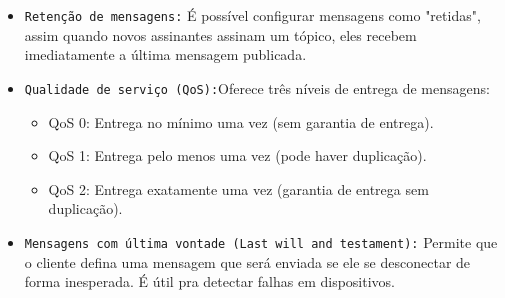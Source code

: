 \documentclass[a4paper]{article}
\begin{document}
\begin{answer}
\begin{enumerate}
            \begin{itemize}
                    \item \texttt {Retenção de mensagens:}  É possível configurar mensagens como "retidas", assim quando novos assinantes assinam um tópico, eles recebem imediatamente a última mensagem publicada.
                    \item \texttt {Qualidade de serviço (QoS):}Oferece três níveis de entrega de mensagens:
                        \begin{itemize}
                            \item QoS 0: Entrega no mínimo uma vez (sem garantia de entrega).
                            \item QoS 1: Entrega pelo menos uma vez (pode haver duplicação).
                            \item QoS 2: Entrega exatamente uma vez (garantia de entrega sem duplicação).
                        \end{itemize}
                    \item \texttt {Mensagens com última vontade (Last will and testament):} Permite que o cliente defina uma mensagem que será enviada se ele se desconectar de forma inesperada. É útil pra detectar falhas em dispositivos.
                \end{itemize}

        \end{enumerate}

    \end{answer}
\end{document}
